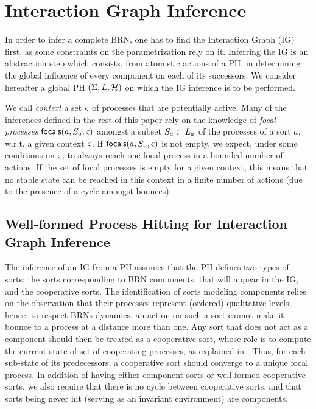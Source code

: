 \section{Interaction Graph Inference}\label{sec:infer-IG}

In order to infer a complete BRN, one has to find the Interaction Graph (IG) first, as some constraints on the parametrization rely on it.
Inferring the IG is an abstraction step which consists, from atomistic actions of a PH, in determining the global influence of every component on each of its successors.
We consider hereafter a global PH $(\Sigma,L,\mathcal{H})$ on which the IG inference is to be performed.

We call \emph{context} a set $\varsigma$ of processes that are potentially active.
Many of the inferences defined in the rest of this paper rely on the knowledge of \emph{focal processes} $\mathsf{focals}(a,S_a,\varsigma)$ %
amongst a subset $S_a \subset L_a$ of the processes of a sort $a$, w.r.t. a given context $\varsigma$. %
If $\mathsf{focals}(a,S_a,\varsigma)$ is not empty, we expect, under some conditions on $\varsigma$, to always reach one focal process in a bounded number of actions.
If the set of focal processes is empty for a given context, this means that no stable state can be reached in this context in a finite number of actions (due to the presence of a cycle amongst bounces).



\subsection{Well-formed Process Hitting for Interaction Graph Inference}\label{ssec:wf}

The inference of an IG from a PH assumes that the PH defines two types of sorts: the sorts corresponding to BRN components, that will appear in the IG, and the cooperative sorts.
The identification of sorts modeling components relies on the observation that their processes represent (ordered) qualitative levels;
hence, to respect BRNs dynamics, an action on such a sort cannot make it bounce to a process at a distance more than one.
Any sort that does not act as a component should then be treated as a cooperative sort, whose role is to compute the current state of set of cooperating processes, as explained in .
Thus, for each sub-state of its predecessors, a cooperative sort should converge to a unique focal process. %
In addition of having either component sorts or well-formed cooperative sorts, we also require that there is no cycle between cooperative sorts, and that sorts being never hit (\ie serving as an invariant environment) are components.

